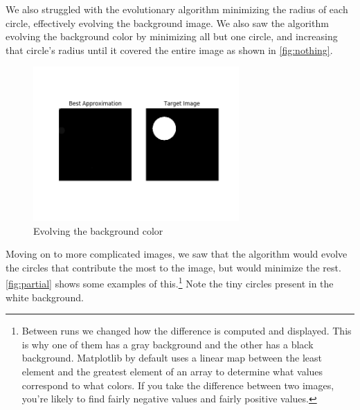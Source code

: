 \documentclass{article}
\begin{document}
We also struggled with the evolutionary algorithm minimizing the radius of each circle, effectively
evolving the background image. We also saw the algorithm evolving the background color by
minimizing all but one circle, and increasing that circle's radius until it covered the entire
image as shown in \autoref{fig:nothing}.

\begin{figure}[H]
    \centering
    \includegraphics[width=0.7\textwidth]{output/evolve_nothing.png}
    \caption{Evolving the background color}\label{fig:nothing}
\end{figure}

Moving on to more complicated images, we saw that the algorithm would evolve the circles that
contribute the most to the image, but would minimize the rest. \autoref{fig:partial} shows some
examples of this.\footnote{Between runs we changed how the difference is computed and displayed.
    This is why one of them has a gray background and the other has a black background. Matplotlib
    by default uses a linear map between the least element and the greatest element of an array to
    determine what values correspond to what colors. If you take the difference between two images,
    you're likely to find fairly negative values and fairly positive values.} Note the tiny circles
present in the white background.
\end{document}
